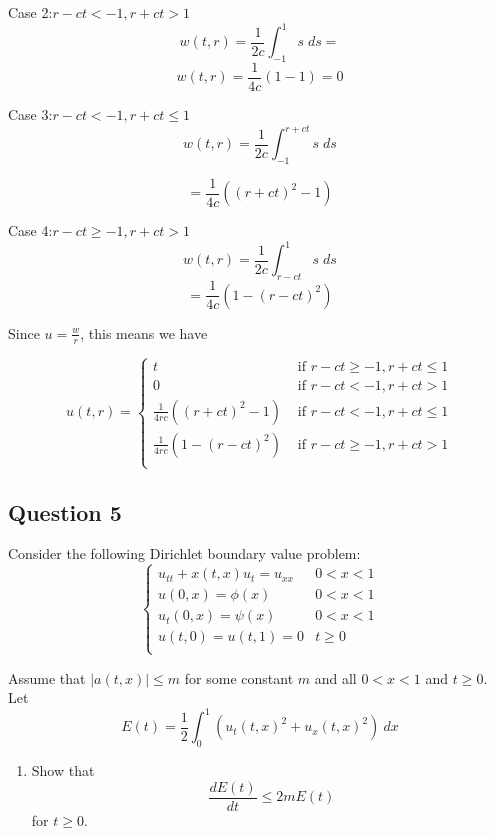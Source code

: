 \documentclass[
]{article}
\providecommand{\tightlist}{%
  \setlength{\itemsep}{0pt}\setlength{\parskip}{0pt}}
\begin{document}
Case 2:\(r-ct < -1, r+ct>1\)
\[w(t,r)= \frac{1}{2c} \int_{-1}^{1}{s\;ds}=\]
\[w(t,r)= \frac{1}{4c} (1-1)=0\]

Case 3:\(r-ct < -1, r+ct \leq 1\)
\[w(t,r)= \frac{1}{2c} \int_{-1}^{r+ct}{s\;ds}\]

\[= \frac{1}{4c} ((r+ct)^2-1)\]

Case 4:\(r-ct \geq -1, r+ct>1\)
\[w(t,r)= \frac{1}{2c} \int_{r-ct}^{1}{s\;ds}\]
\[= \frac{1}{4c} (1-(r-ct)^2)\]

Since \(u=\frac{w}{r}\), this means we have

\begin{tcolorbox}[colback=white, title=Solution]
\begin{equation}u(t,r)=
    \begin{cases} 
      t & \text{ if } r-ct \geq -1, r+ct \leq 1\\
      0 & \text{ if } r-ct < -1, r+ct > 1\\
      \frac{1}{4rc} ((r+ct)^2-1) & \text{ if } r-ct < -1, r+ct \leq 1\\
      \frac{1}{4rc} (1-(r-ct)^2) &\text{ if }  r-ct \geq -1, r+ct > 1\\
    \end{cases}       
\end{equation}
\end{tcolorbox}

\hypertarget{question-5}{%
\subsection{Question 5}\label{question-5}}

Consider the following Dirichlet boundary value problem:
\begin{equation} 
\begin{cases}
  u_{tt}+x(t,x)u_t=u_{xx} & 0<x<1 \\
  u(0,x)=\phi(x) & 0<x<1 \\
  u_t(0,x)=\psi(x) & 0<x<1 \\
  u(t,0) = u(t,1)=0 & t \geq 0 \\
\end{cases}
\end{equation}

Assume that \(\lvert a(t,x)\rvert \leq m\) for some constant \(m\) and
all \(0<x<1\) and \(t\geq 0\). Let
\[E(t)= \frac{1}{2} \int_{0}^{1}{ \left(u_t(t,x)^2+u_x(t,x)^2\right)}\:dx \]

\begin{enumerate}
\def\labelenumi{(\arabic{enumi})}
\tightlist
\item
  Show that \begin{equation}\label{eqn:E} 
  \frac{dE(t)}{dt} \leq 2mE(t)
  \end{equation} for \(t \geq 0\).
\end{enumerate}
\end{document}
